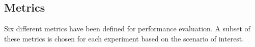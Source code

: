 %


\subsection{Metrics}

Six different metrics have been defined for performance evaluation. A subset of these metrics is chosen for each experiment based on the scenario of interest.%

